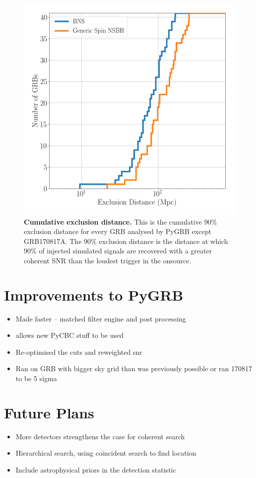 \documentclass[11pt]{cuthesis}
\begin{document}
\begin{figure}
\begin{center}
\includegraphics[width=0.8\linewidth]{pygrb_exclusion_distance.png}
\end{center}
\caption{\textbf{Cumulative exclusion distance.} This is the cumulative $90\%$ exclusion distance for every GRB analysed by PyGRB except GRB170817A.  The $90\%$ exclusion distance is the distance at which $90\%$ of injected simulated signals are recovered with a greater coherent SNR than the loudest trigger in the onsource. }
\label{fig:ex dist}
\end{figure}

\FloatBarrier
\section{Improvements to PyGRB} \label{sec:pygrb improvements}
\begin{itemize}
\item Made faster -- matched filter engine and post processing
\item allows new PyCBC stuff to be used
\item Re-optimised the cuts and reweighted snr
\item Ran on GRB with bigger sky grid than was previously possible or ran 170817 to be 5 sigma
\end{itemize}


\section{Future Plans}
\begin{itemize}
\item More detectors strengthens the case for coherent search
\item Hierarchical search, using coincident search to find location 
\item Include astrophysical priors in the detection statistic
\end{itemize}
\end{document}
